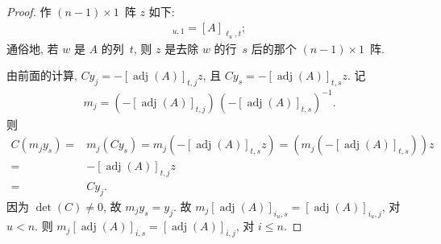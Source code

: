 \documentclass[../libro.tex]{subfiles}
\begin{document}
\begin{proof}
    作 \((n-1) \times 1\)~阵 \(z\) 如下:
    \begin{align*}
        [z]_{u,1} = [A]_{\ell_u,t};
    \end{align*}
    通俗地, 若 \(w\) 是 \(A\) 的列~\(t\),
    则 \(z\) 是去除 \(w\) 的行~\(s\) 后的那个
    \((n-1) \times 1\)~阵.

    由前面的计算,
    \(C y_j = -[\operatorname{adj} {(A)}]_{t,j} z\),
    且
    \(C y_s = -[\operatorname{adj} {(A)}]_{t,s} z\).
    记
    \begin{align*}
        m_j =
        (-[\operatorname{adj} {(A)}]_{t,j})\,
        (-[\operatorname{adj} {(A)}]_{t,s})^{-1}.
    \end{align*}
    则
    \begin{align*}
        C (m_j y_s)
        = {} & m_j (C y_s)
        = m_j (-[\operatorname{adj} {(A)}]_{t,s} z)
        = (m_j (-[\operatorname{adj} {(A)}]_{t,s})) z
        \\
        = {} &
        {-} [\operatorname{adj} {(A)}]_{t,j} z
        \\
        = {} &
        C y_j.
    \end{align*}
    因为 \(\det {(C)} \neq 0\),
    故 \(m_j y_s = y_j\).
    故 \(m_j [\operatorname{adj} {(A)}]_{i_u,s}
    = [\operatorname{adj} {(A)}]_{i_u,j}\),
    对 \(u < n\).
    则 \(m_j [\operatorname{adj} {(A)}]_{i,s}
    = [\operatorname{adj} {(A)}]_{i,j}\),
    对 \(i \leq n\).
\end{proof}




\end{document}
